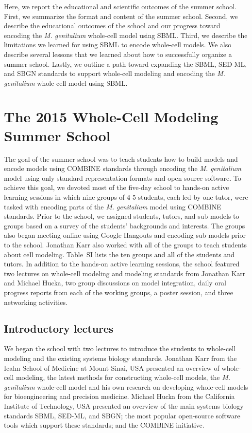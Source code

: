 \documentclass[journal,transmag]{IEEEtran}
\begin{document}
Here, we report the educational and scientific outcomes of the summer school. 
First, we summarize the format and content of the summer school. 
Second, we describe the educational outcomes of the school and our progress toward encoding the \textit{M. genitalium} whole-cell model using SBML. 
Third, we describe the limitations we learned for using SBML to encode whole-cell models. We also describe several lessons that we learned about how to successfully organize a summer school. 
Lastly, we outline a path toward expanding the SBML, SED-ML, and SBGN standards to support whole-cell modeling and encoding the \textit{M. genitalium} whole-cell model using SBML.

\section{The 2015 Whole-Cell Modeling Summer School}
The goal of the summer school was to teach students how to build models and encode models using COMBINE standards through encoding the \textit{M. genitalium} model using only standard representation formats and open-source software. 
To achieve this goal, we devoted most of the five-day school to hands-on active learning sessions in which nine groups of 4-5 students, each led by one tutor, were tasked with encoding parts of the \textit{M. genitalium} model using COMBINE standards. 
Prior to the school, we assigned students, tutors, and sub-models to groups based on a survey of the students' backgrounds and interests. 
The groups also began meeting online using Google Hangouts and encoding sub-models prior to the school. 
Jonathan Karr also worked with all of the groups to teach students about cell modeling. 
Table~SI lists the ten groups and all of the students and tutors. 
In addition to the hands-on active learning sessions, the school featured two lectures on whole-cell modeling and modeling standards from Jonathan Karr and Michael Hucka, two group discussions on model integration, daily oral progress reports from each of the working groups, a poster session, and three networking activities.

\subsection{Introductory lectures}
We began the school with two lectures to introduce the students to whole-cell modeling and the existing systems biology standards. Jonathan Karr from the Icahn School of Medicine at Mount Sinai, USA presented an overview of whole-cell modeling, the latest methods for constructing whole-cell models, the \textit{M. genitalium} whole-cell model and his own research on developing whole-cell models for bioengineering and precision medicine. Michael Hucka from the California Institute of Technology, USA presented an overview of the main systems biology standards SBML, SED-ML, and SBGN; the most popular open-source software tools which support these standards; and the COMBINE initiative.
\end{document}
